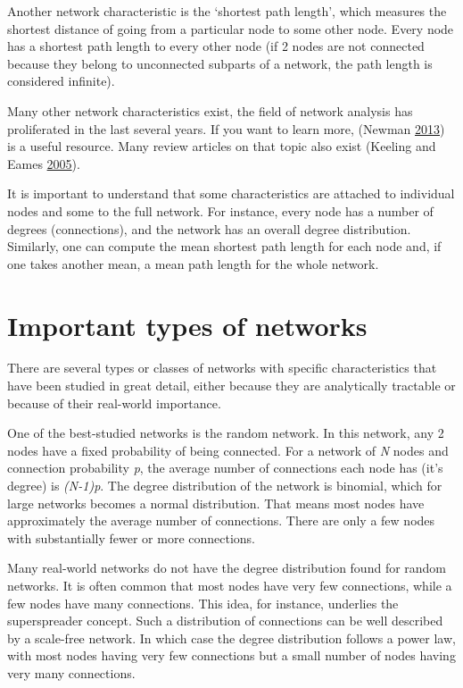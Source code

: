 \documentclass[
]{book}
\begin{document}
Another network characteristic is the `shortest path length', which measures the shortest distance of going from a particular node to some other node. Every node has a shortest path length to every other node (if 2 nodes are not connected because they belong to unconnected subparts of a network, the path length is considered infinite).

Many other network characteristics exist, the field of network analysis has proliferated in the last several years. If you want to learn more, (Newman \protect\hyperlink{ref-newman13}{2013}) is a useful resource. Many review articles on that topic also exist (Keeling and Eames \protect\hyperlink{ref-keeling05}{2005}).

It is important to understand that some characteristics are attached to individual nodes and some to the full network. For instance, every node has a number of degrees (connections), and the network has an overall degree distribution. Similarly, one can compute the mean shortest path length for each node and, if one takes another mean, a mean path length for the whole network.

\hypertarget{important-types-of-networks}{%
\section{Important types of networks}\label{important-types-of-networks}}

There are several types or classes of networks with specific characteristics that have been studied in great detail, either because they are analytically tractable or because of their real-world importance.

One of the best-studied networks is the random network. In this network, any 2 nodes have a fixed probability of being connected. For a network of \emph{N} nodes and connection probability \emph{p}, the average number of connections each node has (it's degree) is \emph{(N-1)p}. The degree distribution of the network is binomial, which for large networks becomes a normal distribution. That means most nodes have approximately the average number of connections. There are only a few nodes with substantially fewer or more connections.

Many real-world networks do not have the degree distribution found for random networks. It is often common that most nodes have very few connections, while a few nodes have many connections. This idea, for instance, underlies the superspreader concept. Such a distribution of connections can be well described by a scale-free network. In which case the degree distribution follows a power law, with most nodes having very few connections but a small number of nodes having very many connections.
\end{document}
